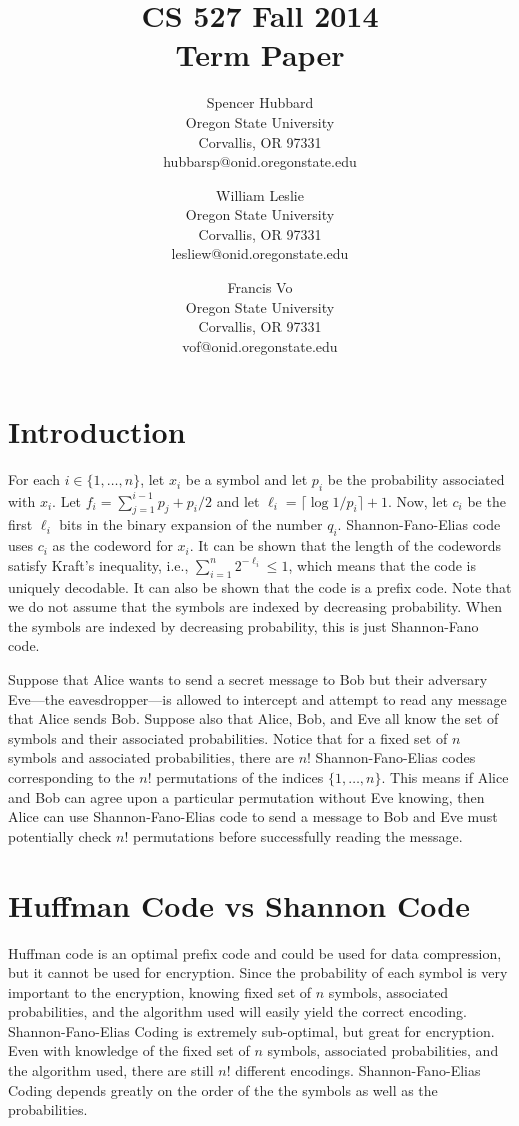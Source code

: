 \documentclass[10pt,letterpaper,notitlepage,draft]{article}
\title{CS 527 Fall 2014\\Term Paper}
\author{\small
\small Spencer Hubbard\\
\small Oregon State University\\
\small Corvallis, OR 97331\\
\small hubbarsp@onid.oregonstate.edu
\and
\small William Leslie\\
\small Oregon State University\\
\small Corvallis, OR 97331\\
\small lesliew@onid.oregonstate.edu
\and
\small Francis Vo\\
\small Oregon State University\\
\small Corvallis, OR 97331\\
\small vof@onid.oregonstate.edu
} %
\date{} %
\theoremstyle{definition}
\begin{document}
\maketitle


\section{Introduction}
For each $i \in \lbrace 1, \ldots, n\rbrace$, let $x_i$ be a symbol and let $p_i$ be the probability associated with $x_i$. 
Let $f_i = \sum_{j=1}^{i-1} p_j + p_i / 2$ and let $\ell_i = \lceil\log 1 / p_i \rceil + 1$. 
Now, let $c_i$ be the first $\ell_i$ bits in the binary expansion of the number $q_i$. 
Shannon-Fano-Elias code uses $c_i$ as the codeword for $x_i$. 
It can be shown that the length of the codewords satisfy Kraft's inequality, i.e., $\sum_{i=1}^n 2^{-\ell_i} \le 1$, which means that the code is uniquely decodable. 
It can also be shown that the code is a prefix code. 
Note that we do not assume that the symbols are indexed by decreasing probability. 
When the symbols are indexed by decreasing probability, this is just Shannon-Fano code.

Suppose that Alice wants to send a secret message to Bob but their adversary Eve---the eavesdropper---is allowed to intercept and attempt to read any message that Alice sends Bob. 
Suppose also that Alice, Bob, and Eve all know the set of symbols and their associated probabilities. 
Notice that for a fixed set of $n$ symbols and associated probabilities, there are $n!$ Shannon-Fano-Elias codes corresponding to the $n!$ permutations of the indices $\lbrace 1, \dots, n\rbrace$. 
This means if Alice and Bob can agree upon a particular permutation without Eve knowing, then Alice can use Shannon-Fano-Elias code to send a message to Bob and Eve must potentially check $n!$ permutations before successfully reading the message.

\section{Huffman Code vs Shannon Code}
Huffman code is an optimal prefix code and could be used for data compression, but it cannot be used for encryption.
Since the probability of each symbol is very important to the encryption, knowing fixed set of $n$ symbols, associated probabilities, and the algorithm used will easily yield the correct encoding.
Shannon-Fano-Elias Coding is extremely sub-optimal, but great for encryption.
Even with knowledge of the fixed set of $n$ symbols, associated probabilities, and the algorithm used, there are still $n!$ different encodings. 
Shannon-Fano-Elias Coding depends greatly on the order of the the symbols as well as the probabilities.
\end{document}

